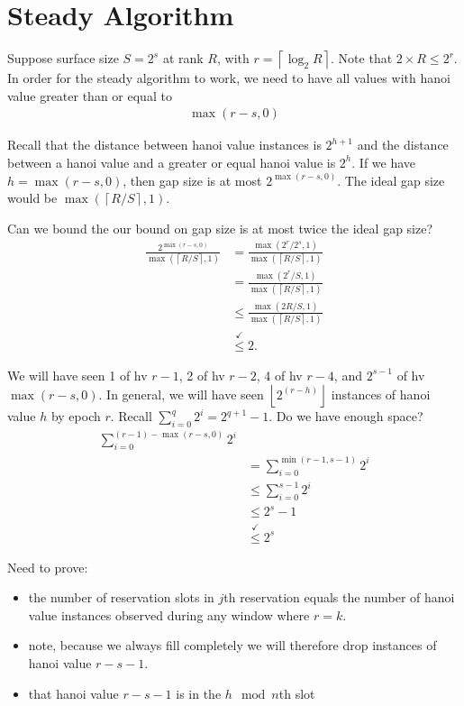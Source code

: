 \section{Steady Algorithm}

Suppose surface size $S = 2^s$ at rank $R$, with $r = \left\lceil \log_2 R \right\rceil$.
Note that $2 \times R \leq 2^r$.
In order for the steady algorithm to work, we need to have all values with hanoi value greater than or equal to
\begin{align*}
\max(r - s, 0)
\end{align*}

Recall that the distance between hanoi value instances is $2^{h + 1}$ and the distance between a hanoi value and a greater or equal hanoi value is $2^h$.
If we have $h = \max (r - s, 0)$, then gap size is at most $2^{\max(r - s, 0)}$.
The ideal gap size would be $\max( \left\lceil R / S \right\rceil, 1)$.

Can we bound the our bound on gap size is at most twice the ideal gap size?
\begin{align*}
\frac{
  2^{\max(r - s, 0)}
}{
  \max(\left\lceil R / S \right\rceil, 1)
}
&=
\frac{
  \max(2^r / 2^s, 1)
}{
  \max(\left\lceil R / S \right\rceil, 1)
} \\
&=
\frac{
  \max(2^r / S, 1)
}{
  \max(\left\lceil R / S \right\rceil, 1)
} \\
&\leq
\frac{
  \max(2R / S, 1)
}{
  \max(\left\lceil R / S \right\rceil, 1)
} \\
&\stackrel{\checkmark}{\leq} 2.
\end{align*}

We will have seen 1 of hv $r - 1$, 2 of hv $r - 2$, 4 of hv $r - 4$, and $2 ^ {s - 1}$ of hv $\max(r - s, 0)$.
In general, we will have seen $\left\lfloor 2 ^ (r - h) \right\rfloor$ instances of hanoi value $h$ by epoch $r$.
Recall $\sum_{i = 0}^{q} 2^i = 2 ^ {q + 1} - 1$.
Do we have enough space?
\begin{align*}
\sum_{i = 0}^{(r - 1) - \max(r - s, 0)} 2 ^ i \\
&= \sum_{i = 0}^{\min(r - 1, s - 1)} 2 ^ i \\
&\leq \sum_{i = 0}^{s - 1} 2 ^ i \\
&\leq 2^s - 1\\
&\stackrel{\checkmark}{\leq} 2^s
\end{align*}

Need to prove:
\begin{itemize}
\item the number of reservation slots in $j$th reservation equals the number of hanoi value instances observed during any window where $r = k$.
\item note, because we always fill completely we will therefore drop instances of hanoi value $r - s - 1$.
\item that hanoi value $r - s - 1$ is in the $h \mod n$th slot
\end{itemize}

